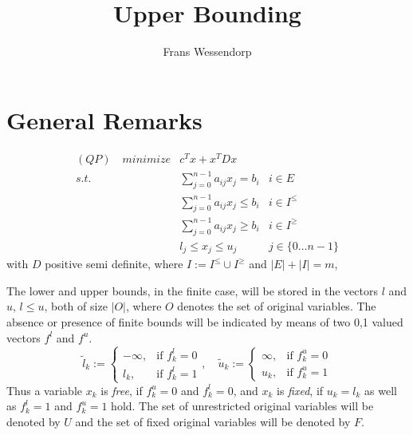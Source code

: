 \documentclass[a4paper]{article}
\title{Upper Bounding}
\author{Frans Wessendorp}
\begin{document}
\maketitle
\section{General Remarks}
\begin{eqnarray}
\label{def:QP_UB}
(QP)\quad minimize&  c^{T}x + x^{T} D x      	&  \nonumber \\
s.t.	 & \sum_{j=0}^{n-1}a_{ij}x_{j} = b_{i}	& i \in E  \nonumber \\
	 & \sum_{j=0}^{n-1}a_{ij}x_{j} \leq b_{i} & i \in I^{\leq} \\
	 & \sum_{j=0}^{n-1}a_{ij}x_{j} \geq b_{i} & i \in I^{\geq}  \nonumber \\
 	 & \mathit{l}_{j} \leq x_{j} \leq u_{j}	  & j \in \{0 \ldots n-1 \}
	 \nonumber
\end{eqnarray}
with $D$ positive semi definite, where $I:= I^{\leq} \cup I^{\geq}$ and
$\left| E \right| + \left| I \right| = m$,

The lower and upper bounds, in the finite case,  will be stored in the vectors
$l$ and $u$, $l \leq u$, both of size $\left|O\right|$, where
$O$ denotes the set of original variables. The absence or presence of finite
bounds will be indicated by means of two 0,1 valued vectors $f^{l}$ and $f^{u}$.
\begin{equation}
\label{def: }
\tilde{l}_{k}:=
\left\{
\begin{array}{ll}
-\infty, & \text{if $f^{l}_{k}=0$} \\
l_{k},  & \text{if $f^{l}_{k}=1$}
\end{array}
\right.,
\quad
\tilde{u}_{k}:=
\left\{
\begin{array}{ll}
\infty, & \text{if $f^{u}_{k}=0$} \\
u_{k},  & \text{if $f^{u}_{k}=1$}
\end{array}
\right.
\end{equation}
Thus a variable $x_{k}$ is \emph{free}, if $f_{k}^{u}=0$ and
$f_{k}^{l}=0$, and $x_{k}$ is \emph{fixed}, if $u_{k}=l_{k}$ as well as
$f_{k}^{l}=1$ and $f_{k}^{u}=1$ hold. The set of unrestricted original variables
will be denoted by $U$ and the set of fixed original variables will be denoted
by $F$.
\end{document}

